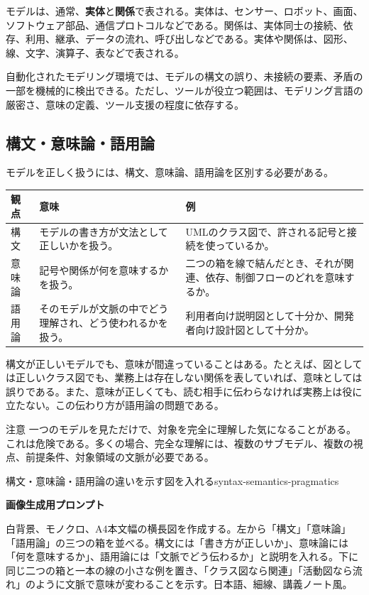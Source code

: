 \documentclass[a4paper,11pt]{ltjsarticle}
\newcommand{\prompt}[1]{\par\noindent\textbf{画像生成用プロンプト}\par\small #1\normalsize}
\begin{document}
モデルは、通常、\textbf{実体}と\textbf{関係}で表される。実体は、センサー、ロボット、画面、ソフトウェア部品、通信プロトコルなどである。関係は、実体同士の接続、依存、利用、継承、データの流れ、呼び出しなどである。実体や関係は、図形、線、文字、演算子、表などで表される。

自動化されたモデリング環境では、モデルの構文の誤り、未接続の要素、矛盾の一部を機械的に検出できる。ただし、ツールが役立つ範囲は、モデリング言語の厳密さ、意味の定義、ツール支援の程度に依存する。

\subsection{構文・意味論・語用論}
モデルを正しく扱うには、構文、意味論、語用論を区別する必要がある。

\begin{longtable}{>{\raggedright\arraybackslash}p{}>{\raggedright\arraybackslash}p{}>{\raggedright\arraybackslash}p{}}
\toprule
\textbf{観点} & \textbf{意味} & \textbf{例} \\
\midrule
構文 & モデルの書き方が文法として正しいかを扱う。 & UMLのクラス図で、許される記号と接続を使っているか。\\
意味論 & 記号や関係が何を意味するかを扱う。 & 二つの箱を線で結んだとき、それが関連、依存、制御フローのどれを意味するか。\\
語用論 & そのモデルが文脈の中でどう理解され、どう使われるかを扱う。 & 利用者向け説明図として十分か、開発者向け設計図として十分か。\\
\bottomrule
\end{longtable}

構文が正しいモデルでも、意味が間違っていることはある。たとえば、図としては正しいクラス図でも、業務上は存在しない関係を表していれば、意味としては誤りである。また、意味が正しくても、読む相手に伝わらなければ実務上は役に立たない。この伝わり方が語用論の問題である。

\begin{pointbox}{注意}
一つのモデルを見ただけで、対象を完全に理解した気になることがある。これは危険である。多くの場合、完全な理解には、複数のサブモデル、複数の視点、前提条件、対象領域の文脈が必要である。
\end{pointbox}

\begin{todobox}{構文・意味論・語用論の違いを示す図を入れる}{syntax-semantics-pragmatics}
\prompt{白背景、モノクロ、A4本文幅の横長図を作成する。左から「構文」「意味論」「語用論」の三つの箱を並べる。構文には「書き方が正しいか」、意味論には「何を意味するか」、語用論には「文脈でどう伝わるか」と説明を入れる。下に同じ二つの箱と一本の線の小さな例を置き、「クラス図なら関連」「活動図なら流れ」のように文脈で意味が変わることを示す。日本語、細線、講義ノート風。}
\end{todobox}
\end{document}
